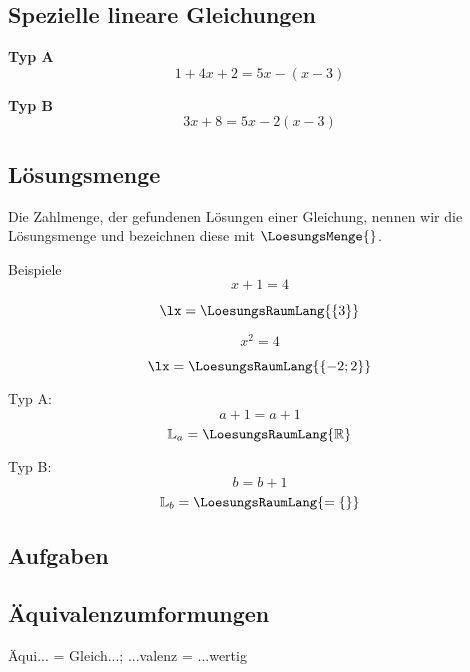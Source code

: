 \subsection{Spezielle lineare Gleichungen}
\textbf{Typ A}\\

$$1+4x+2 = 5x - (x-3)$$

\textbf{Typ B}\\

$$3x+8 = 5x-2(x-3)$$


\subsection{Lösungsmenge}
  Die Zahlmenge, der gefundenen Lösungen einer Gleichung, nennen wir
  die Lösungsmenge und bezeichnen diese mit $\LoesungsMenge{}$.

  Beispiele
$$x+1=4$$
  
  $$\lx=\LoesungsRaumLang{\{3\}}$$


  $$x^2=4$$

  $$\lx=\LoesungsRaumLang{\{-2; 2\}}$$

Typ A:
$$a+1=a+1$$
   $$\mathbb{L}_a= \LoesungsRaumLang{\mathbb{R}}$$


Typ B:
$$b = b+1$$
$$\mathbb{L}_b=\LoesungsRaumLang{=\{\}}$$


\subsection*{Aufgaben}


\newpage

\subsection{Äquivalenzumformungen}
Äqui... = Gleich...; ...valenz = ...wertig

